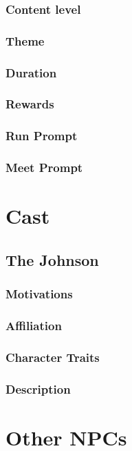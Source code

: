 \documentclass{ShadowTeXSR5}
\begin{document}
\subsubsection{Content level}
\lipsum[1]
\subsubsection{Theme}
\lipsum[1]
\subsubsection{Duration}
\lipsum[1]
\subsubsection{Rewards}
\lipsum[1]
\subsubsection{Run Prompt}
\lipsum[1]
\subsubsection{Meet Prompt}
\lipsum[1]

\section{Cast}
\lipsum[1]
\subsection{The Johnson}
\lipsum[1]
\subsubsection{Motivations}
\lipsum[1]
\subsubsection{Affiliation}
\lipsum[1]
\subsubsection{Character Traits}
\lipsum[1]
\subsubsection{Description}
\lipsum[1]

\section{Other NPCs}
\lipsum[1]
\end{document}
